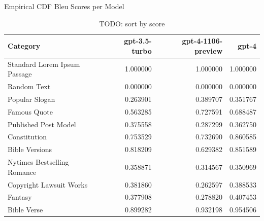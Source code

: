 \documentclass{article}
\begin{document}
\begin{table}[htbp]
    \centering
    \caption{Empirical CDF Bleu Scores per Model}
    \begin{tabular}{lrrr}
    \toprule
    Category & gpt-3.5-turbo & gpt-4-1106-preview & gpt-4 \\
    \midrule
    Standard Lorem Ipsum Passage & 1.000000 & 1.000000 & 1.000000 \\
    Random Text & 0.000000 & 0.000000 & 0.000000 \\
    Popular Slogan & 0.263901 & 0.389707 & 0.351767 \\
    Famous Quote & 0.563285 & 0.727591 & 0.688487 \\
    Published Post Model & 0.375558 & 0.287299 & 0.362750 \\
    Constitution & 0.753529 & 0.732690 & 0.860585 \\
    Bible Versions & 0.818209 & 0.629382 & 0.851589 \\
    Nytimes Bestselling Romance & 0.358871 & 0.314567 & 0.350969 \\
    Copyright Lawsuit Works & 0.381860 & 0.262597 & 0.388533 \\
    Fantasy & 0.377908 & 0.278820 & 0.407453 \\
    Bible Verse & 0.899282 & 0.932198 & 0.954506 \\
    \bottomrule
    \end{tabular}
    \caption{TODO: sort by score}
\end{table}


\end{document}
